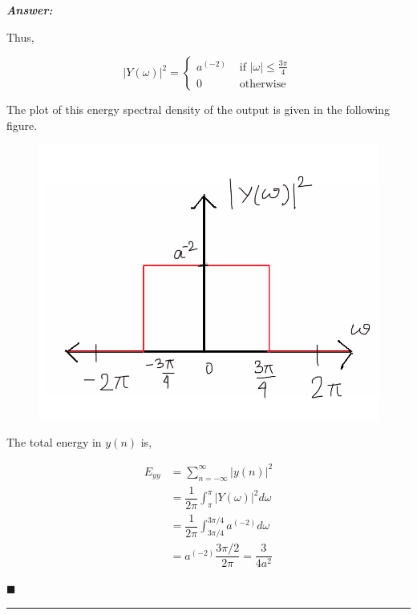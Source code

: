 \documentclass[12pt]{article}
\theoremstyle{definition}
\newenvironment{answer}{
    \textbf{\textit{Answer:}} \qquad
}{\hfill $\blacksquare$ \\ 

\begin{center}
    \rule{0.8\linewidth}{1.5px} 
    \vspace*{1cm}   
\end{center}
}
\newcommand{\inv}[1][1]{^{(- #1)}}
\begin{document}
\begin{answer}
\begin{enumerate}
        Thus, 

        $$
        \vert Y(\omega) \vert^2
        = \begin{cases}
            a\inv[2] & \text{ if } \vert \omega \vert \leq \frac{3\pi}{4}\\
            0 & \text{ otherwise }
        \end{cases}
        $$

        The plot of this energy spectral density of the output is given in the following figure.

        \begin{figure}[H]
            \centering
            \includegraphics[width = 0.7\linewidth]{energy.png}
        \end{figure}

        The total energy in $y(n)$ is,

        \begin{align*}
            E_{yy}
            & = \sum_{n = -\infty}^{\infty} \vert y(n)\vert^2\\
            & = \dfrac{1}{2\pi} \int_{\pi}^{\pi} \vert Y(\omega) \vert^2 d\omega\\
            & = \dfrac{1}{2\pi} \int_{3\pi/4}^{3\pi/4} a\inv[2] d\omega\\
            & = a\inv[2] \dfrac{3\pi / 2}{2\pi} = \dfrac{3}{4a^2}
        \end{align*}
    \end{enumerate}
\end{answer}
\end{document}

